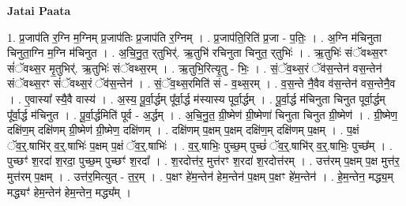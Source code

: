 \documentclass[17pt]{extarticle}
\begin{document}
\textbf{Jatai Paata} \newline

1. प्र॒जाप॑ति र॒ग्नि म॒ग्निम् प्र॒जाप॑तिः प्र॒जाप॑ति र॒ग्निम् । . प्र॒जाप॑ति॒रिति॑ प्र॒जा - प॒तिः॒ । . अ॒ग्नि म॑चिनुता चिनुता॒ग्नि म॒ग्नि म॑चिनुत । . अ॒चि॒नु॒त॒ र्‌तुभिर्॑. ऋ॒तुभि॑ रचिनुता चिनुत॒ र्‌तुभिः॑ । . ऋ॒तुभिः॑ संॅवथ्स॒रꣳ सं॑ॅवथ्स॒र मृ॒तुभिर्॑. ऋ॒तुभिः॑ संॅवथ्स॒रम् । . ऋ॒तुभि॒रित्यृ॒तु - भिः॒ । . सं॒ॅव॒थ्स॒रं ॅव॑स॒न्तेन॑ वस॒न्तेन॑ संॅवथ्स॒रꣳ सं॑ॅवथ्स॒रं ॅव॑स॒न्तेन॑ । . सं॒ॅव॒थ्स॒रमिति॑ सं - व॒थ्स॒रम् । . व॒स॒न्ते नै॒वैव व॑स॒न्तेन॑ वस॒न्तेनै॒व । . ए॒वास्या᳚ स्यै॒वै वास्य॑ । . अ॒स्य॒ पू॒र्वा॒र्द्धम् पू᳚र्वा॒र्द्ध म॑स्यास्य पूर्वा॒र्द्धम् । . पू॒र्वा॒र्द्ध म॑चिनुता चिनुत पूर्वा॒र्द्धम् पू᳚र्वा॒र्द्ध म॑चिनुत । . पू॒र्वा॒र्द्धमिति॑ पूर्व - अ॒र्द्धम् । . अ॒चि॒नु॒त॒ ग्री॒ष्मेण॑ ग्री॒ष्मेणा॑ चिनुता चिनुत ग्री॒ष्मेण॑ । . ग्री॒ष्मेण॒ दक्षि॑ण॒म् दक्षि॑णम् ग्री॒ष्मेण॑ ग्री॒ष्मेण॒ दक्षि॑णम् । . दक्षि॑णम् प॒क्षम् प॒क्षम् दक्षि॑ण॒म् दक्षि॑णम् प॒क्षम् । . प॒क्षं ॅव॒र्॒.षाभि॑र् व॒र्॒.षाभिः॑ प॒क्षम् प॒क्षं ॅव॒र्॒.षाभिः॑ । . व॒र्॒.षाभिः॒ पुच्छ॒म् पुच्छं॑ ॅव॒र्॒.षाभि॑र् व॒र्॒.षाभिः॒ पुच्छ᳚म् । . पुच्छꣳ॑ श॒रदा॑ श॒रदा॒ पुच्छ॒म् पुच्छꣳ॑ श॒रदा᳚ । . श॒रदोत्त॑र॒ मुत्त॑रꣳ श॒रदा॑ श॒रदोत्त॑रम् । . उत्त॑रम् प॒क्षम् प॒क्ष मुत्त॑र॒ मुत्त॑रम् प॒क्षम् । . उत्त॑र॒मित्युत् - त॒र॒म् । . प॒क्षꣳ हे॑म॒न्तेन॑ हेम॒न्तेन॑ प॒क्षम् प॒क्षꣳ हे॑म॒न्तेन॑ । . हे॒म॒न्तेन॒ मद्ध्य॒म् मद्ध्यꣳ॑ हेम॒न्तेन॑ हेम॒न्तेन॒ मद्ध्य᳚म् । \newline
\end{document}

